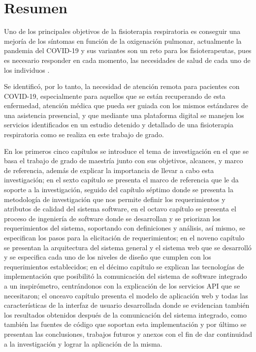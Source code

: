 \documentclass[12pt]{article}
\begin{document}
\section*{Resumen}

Uno de los principales objetivos de la fisioterapia respiratoria es conseguir una mejoría de los síntomas en función de la oxigenación pulmonar, actualmente la pandemia del COVID-19 y sus variantes son un reto para los fisioterapeutas, pues es necesario responder en cada momento, las necesidades de salud de cada uno de los individuos \cite{28}. 

Se identificó, por lo tanto, la necesidad de atención remota para pacientes con COVID-19, especialmente para aquellos que se están recuperando de esta enfermedad, atención médica que pueda ser guiada con los mismos estándares de una asistencia presencial, y que  mediante una plataforma digital se manejen los servicios identificados en un estudio detenido y detallado de una fisioterapia respiratoria como se realiza en este trabajo de grado.

En los primeros cinco capítulos se introduce el tema de investigación en el que se basa el trabajo de grado de maestría junto con sus objetivos, alcances, y marco de referencia, además de explicar la importancia de llevar a cabo esta investigación; en el sexto capítulo se presenta el marco de referencia que le da soporte a la investigación, seguido del capítulo séptimo donde se presenta la metodología de investigación que nos permite definir los requerimientos y atributos de calidad del sistema software, en el octavo capítulo se presenta el proceso de ingeniería de software donde se desarrollan y se priorizan los requerimientos del sistema, soportando con definiciones y análisis, así mismo, se especifican los pasos para la elicitación de requerimientos; en el noveno capítulo se presentan la arquitectura del sistema general y el sistema web que se desarrolló y se especifica cada uno de los niveles de diseño que cumplen con los requerimientos establecidos; en el décimo capítulo se explican las tecnologías de implementación que posibilitó la comunicación del sistema de software integrado a un inspirómetro, centrándonos con la explicación de los servicios API que se necesitaron; el onceavo capítulo presenta el modelo de aplicación web y todas las características de la interfaz de usuario desarrollada donde se evidencian también los resultados obtenidos después de la comunicación del sistema integrado, como también  las fuentes de código que soportan esta implementación y por último se presentan las conclusiones, trabajos futuros y anexos con el fin de dar continuidad a la investigación y lograr la aplicación de la misma. 
\end{document}
